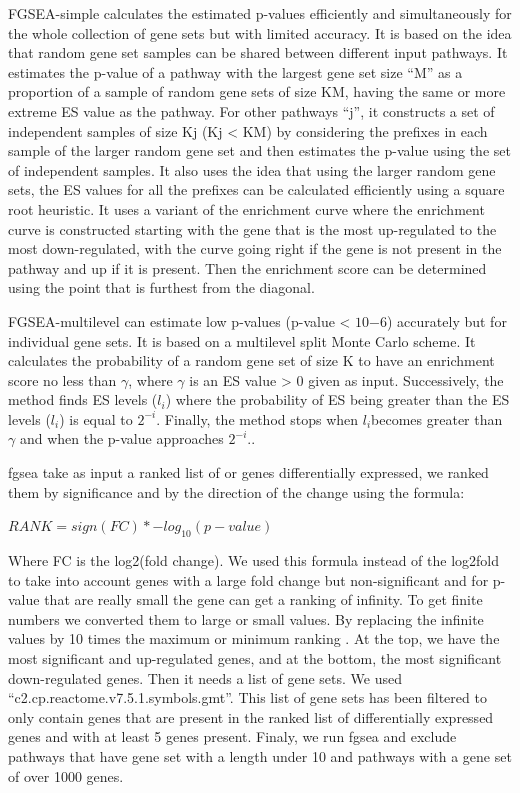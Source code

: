 \documentclass[a4paper, 11pt]{article}
\begin{document}
\begin{multicols}{2}
FGSEA-simple calculates the estimated p-values efficiently and simultaneously for the whole collection of gene sets but with limited accuracy. It is based on the idea that random gene set samples can be shared between different input pathways. It estimates the p-value of a pathway with the largest gene set size “M” as a proportion of a sample of random gene sets of size KM, having the same or more extreme ES value as the pathway. For other pathways “j”, it constructs a set of independent samples of size Kj (Kj < KM) by considering the prefixes in each sample of the larger random gene set and then estimates the p-value using the set of independent samples. It also uses the idea that using the larger random gene sets, the ES values for all the prefixes can be calculated efficiently using a square root heuristic. It uses a variant of the enrichment curve where the enrichment curve is constructed starting with the gene that is the most up-regulated to the most down-regulated, with the curve going right if the gene is not present in the pathway and up if it is present. Then the enrichment score can be determined using the point that is furthest from the diagonal.

FGSEA-multilevel can estimate low p-values (p-value < $10{-6}$) accurately but for individual gene sets. It is based on a multilevel split Monte Carlo scheme. It calculates the probability of a random gene set of size K to have an enrichment score no less than $\gamma$, where $\gamma$ is an ES value > 0 given as input. Successively, the method finds ES levels ($l_i$) where the probability of ES being greater than the ES levels ($l_i$) is equal to $2^{-i}$. Finally, the method stops when $ l_i $becomes greater than $\gamma$ and when the p-value approaches $2^{-i}$.\citep{korotkevich2016fast}.

fgsea take as input a ranked list of or genes differentially expressed, we ranked them by significance and by the direction of the change using the formula:
\bigskip

 $ RANK =sign(FC)* -log_{10}(p-value)  $
 
\bigskip
Where FC is the log2(fold change).
We used this formula instead of the log2fold to take into account genes with a large fold change but non-significant and for p-value that are really small the gene can get a ranking of infinity. To get finite numbers we converted them to large or small values. By replacing the infinite values by 10 times the maximum or minimum ranking .
 At the top, we have the most significant and up-regulated genes, and at the bottom, the most significant down-regulated genes. Then it needs a list of gene sets. We used “c2.cp.reactome.v7.5.1.symbols.gmt”. This list of gene sets has been filtered to only contain genes  that are present in the ranked list of differentially expressed genes and with at least 5 genes present. Finaly, we run fgsea  \citep{fgsea} and exclude pathways that have gene set with a length under 10 and pathways with a gene set of over 1000 genes.
 

\end{multicols}
\end{document}
